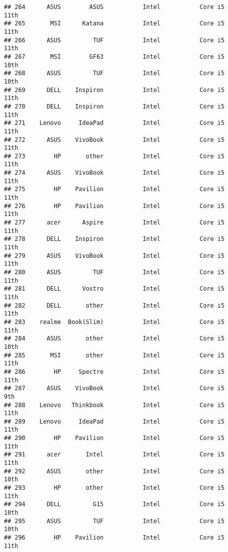 \documentclass[
]{article}
\begin{document}
\begin{verbatim}
## 264      ASUS        ASUS           Intel           Core i5            11th
## 265       MSI      Katana           Intel           Core i5            11th
## 266      ASUS         TUF           Intel           Core i5            11th
## 267       MSI        GF63           Intel           Core i5            10th
## 268      ASUS         TUF           Intel           Core i5            10th
## 269      DELL    Inspiron           Intel           Core i5            11th
## 270      DELL    Inspiron           Intel           Core i5            11th
## 271    Lenovo     IdeaPad           Intel           Core i5            11th
## 272      ASUS    VivoBook           Intel           Core i5            11th
## 273        HP       other           Intel           Core i5            11th
## 274      ASUS    VivoBook           Intel           Core i5            11th
## 275        HP    Pavilion           Intel           Core i5            11th
## 276        HP    Pavilion           Intel           Core i5            11th
## 277      acer      Aspire           Intel           Core i5            11th
## 278      DELL    Inspiron           Intel           Core i5            11th
## 279      ASUS    VivoBook           Intel           Core i5            11th
## 280      ASUS         TUF           Intel           Core i5            11th
## 281      DELL      Vostro           Intel           Core i5            11th
## 282      DELL       other           Intel           Core i5            11th
## 283    realme  Book(Slim)           Intel           Core i5            11th
## 284      ASUS       other           Intel           Core i5            10th
## 285       MSI       other           Intel           Core i5            11th
## 286        HP     Spectre           Intel           Core i5            11th
## 287      ASUS    VivoBook           Intel           Core i5             9th
## 288    Lenovo   Thinkbook           Intel           Core i5            11th
## 289    Lenovo     IdeaPad           Intel           Core i5            11th
## 290        HP    Pavilion           Intel           Core i5            11th
## 291      acer       Intel           Intel           Core i5            11th
## 292      ASUS       other           Intel           Core i5            10th
## 293        HP       other           Intel           Core i5            11th
## 294      DELL         G15           Intel           Core i5            10th
## 295      ASUS         TUF           Intel           Core i5            10th
## 296        HP    Pavilion           Intel           Core i5            11th

\end{verbatim}
\end{document}
